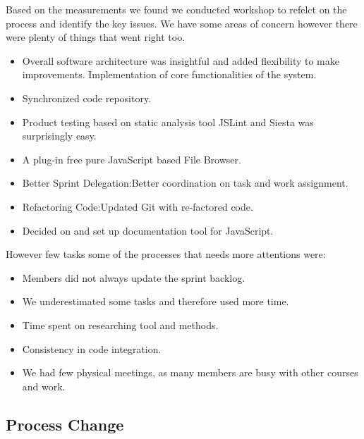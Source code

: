 Based on the measurements we found we conducted workshop to refelct on the process and identify the key issues. We have  some areas of concern however there were plenty of things that went right too.

\begin{itemize}
	\item	Overall software architecture was insightful and added flexibility to make improvements. Implementation of core functionalities of  the system.
	\item	Synchronized code repository.
	\item	Product testing based on static analysis tool JSLint and Siesta was surprisingly easy.
	\item	A plug-in free pure JavaScript based File Browser.
	\item	Better Sprint Delegation:Better coordination on task and work assignment.
	\item	Refactoring Code:Updated Git with re-factored code.
	\item	Decided on and set up documentation tool for JavaScript.
\end{itemize}

However few tasks some of the processes that needs more attentions were:
\begin{itemize}
	\item Members did not always update the sprint backlog.
	\item We underestimated some tasks and therefore used more time.
	\item Time spent on researching tool and methods.
	\item Consistency in code integration.
	\item We had few physical meetings, as many members are busy with other courses and work.
\end{itemize}

\subsection{Process Change}

